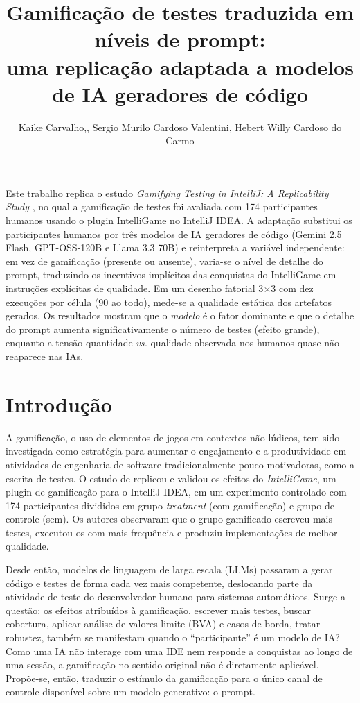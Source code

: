 \documentclass[12pt]{article}
\title{Gamificação de testes traduzida em níveis de prompt:\\ uma replicação
  adaptada a modelos de IA geradores de código}
\author{Kaike Carvalho,\inst{1}, Sergio Murilo Cardoso Valentini\inst{2}, Hebert Willy Cardoso do Carmo\inst{3}}
\begin{document}
\maketitle

\begin{resumo}
  Este trabalho replica o estudo \emph{Gamifying Testing in IntelliJ: A
  Replicability Study} \cite{straubinger2025}, no qual a gamificação de testes
  foi avaliada com 174 participantes humanos usando o plugin IntelliGame no
  IntelliJ IDEA. A adaptação substitui os participantes humanos por três modelos
  de IA geradores de código (Gemini 2.5 Flash, GPT-OSS-120B e Llama 3.3 70B) e
  reinterpreta a variável independente: em vez de gamificação (presente ou
  ausente), varia-se o nível de detalhe do prompt, traduzindo os incentivos
  implícitos das conquistas do IntelliGame em instruções explícitas de
  qualidade. Em um desenho fatorial 3$\times$3 com dez execuções por célula (90
  ao todo), mede-se a qualidade estática dos artefatos gerados. Os resultados
  mostram que o \emph{modelo} é o fator dominante e que o detalhe do prompt
  aumenta significativamente o número de testes (efeito grande), enquanto a
  tensão quantidade \emph{vs.} qualidade observada nos humanos quase não
  reaparece nas IAs.
\end{resumo}

\section{Introdução}

A gamificação, o uso de elementos de jogos em contextos não lúdicos, tem
sido investigada como estratégia para aumentar o engajamento e a produtividade
em atividades de engenharia de software tradicionalmente pouco motivadoras,
como a escrita de testes. O estudo de \cite{straubinger2025} replicou e validou
os efeitos do \emph{IntelliGame}, um plugin de gamificação para o IntelliJ
IDEA, em um experimento controlado com 174 participantes divididos em grupo
\emph{treatment} (com gamificação) e grupo de controle (sem). Os autores
observaram que o grupo gamificado escreveu mais testes, executou-os com mais
frequência e produziu implementações de melhor qualidade.

Desde então, modelos de linguagem de larga escala (LLMs) passaram a gerar código e
testes de forma cada vez mais competente, deslocando parte da atividade de
teste do desenvolvedor humano para sistemas automáticos. Surge a questão: os
efeitos atribuídos à gamificação, escrever mais testes, buscar cobertura,
aplicar análise de valores-limite (BVA) e casos de borda, tratar robustez,
também se manifestam quando o ``participante'' é um modelo de IA? Como uma IA
não interage com uma IDE nem responde a conquistas ao longo de uma sessão, a
gamificação no sentido original não é diretamente aplicável. Propõe-se, então,
traduzir o estímulo da gamificação para o único canal de controle disponível
sobre um modelo generativo: o prompt.
\end{document}
